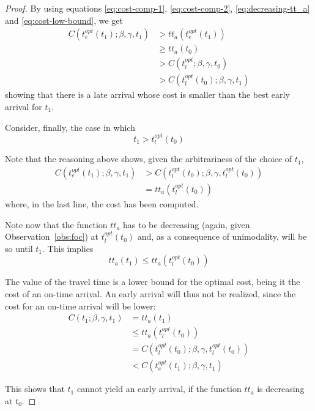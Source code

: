 \begin{proof}
  By using equations \eqref{eq:cost-comp-1}, \eqref{eq:cost-comp-2}, \eqref{eq:decreasing-tt_a} and \eqref{eq:cost-low-bound},
  we get
  \begin{align*}
    C(t_e^{opt}(t_1); \beta, \gamma, t_1) & > tt_a(t_e^{opt}(t_1)) \\
                                          & \geq tt_a(t_0) \\
                                          & > C(t_l^{opt}; \beta, \gamma, t_0) \\
                                          & > C(t_l^{opt}(t_0); \beta, \gamma, t_1)
  \end{align*}
  showing that there is a late arrival whose cost is smaller than the best early arrival for \(t_1\).


  Consider, finally, the case in which \[t_1 > t_l^{opt}(t_0)\]

  Note that the reasoning above shows, given the arbitrariness of the choice of \(t_1\),
  \begin{align*}
    C(t_e^{opt}(t_1); \beta, \gamma, t_1) & > C(t_l^{opt}(t_0); \beta, \gamma, t_l^{opt}(t_0)) \\
                                          & = tt_a(t_l^{opt}(t_0))
  \end{align*}
  where, in the last line, the cost has been computed.

  Note now that the function \(tt_a\) has to be decreasing (again, given Observation~\ref{obs:foc}) at \(t_l^{opt}(t_0)\) and,
  as a consequence of unimodality,
  will be so until \(t_1\). This implies
  \begin{equation*}
    tt_a(t_1) \leq tt_a(t_l^{opt}(t_0))
  \end{equation*}

  The value of the travel time is a lower bound for the optimal cost,
  being it the cost of an on-time arrival.
  An early arrival will thus not be realized,
  since the cost for an on-time arrival will be lower:
  \begin{align*}
    C(t_1; \beta, \gamma, t_1) & = tt_a(t_1) \\
                               & \leq tt_a(t_l^{opt}(t_0)) \\
                               & = C(t_l^{opt}(t_0); \beta, \gamma, t_l^{opt}(t_0)) \\
                               & < C(t_e^{opt}(t_1); \beta, \gamma, t_1)
  \end{align*}

  This shows that \(t_1\) cannot yield an early arrival,
  if the function \(tt_a\) is decreasing at \(t_0\).


\end{proof}
